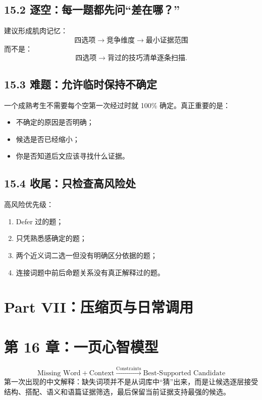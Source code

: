\documentclass[11pt,a4paper]{ctexart}
\begin{document}
\subsection{15.2 逐空：每一题都先问“差在哪？”}
建议形成肌肉记忆：
\[
\boxed{
\text{四选项}
\rightarrow
\text{竞争维度}
\rightarrow
\text{最小证据范围}
}
\]
而不是：
\[
\text{四选项}
\rightarrow
\text{背过的技巧清单逐条扫描}.
\]

\subsection{15.3 难题：允许临时保持不确定}
一个成熟考生不需要每个空第一次经过时就 100\% 确定。真正重要的是：
\begin{itemize}
  \item 不确定的原因是否明确；
  \item 候选是否已经缩小；
  \item 你是否知道后文应该寻找什么证据。
\end{itemize}

\subsection{15.4 收尾：只检查高风险处}
高风险优先级：
\begin{enumerate}
  \item Defer 过的题；
  \item 只凭熟悉感确定的题；
  \item 两个近义词二选一但没有明确区分依据的题；
  \item 连接词题中前后命题关系没有真正解释过的题。
\end{enumerate}

\newpage
\section{Part VII：压缩页与日常调用}

\section{第 16 章：一页心智模型}

\begin{corebox}[完形填空的最终母模型]
\[
\boxed{
\text{Missing Word}
+
\text{Context}
\xrightarrow{\text{Constraints}}
\text{Best-Supported Candidate}
}
\]
第一次出现的中文解释：缺失词项并不是从词库中“猜”出来，而是让候选逐层接受结构、搭配、语义和语篇证据筛选，最后保留当前证据支持最强的候选。
\end{corebox}
\end{document}
